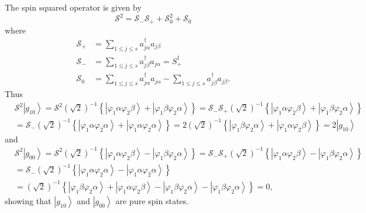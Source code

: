 \documentclass[aps,preprint]{revtex4}%
\begin{document}
The spin squared operator is given by
\[
\mathcal{S}^{2}=\mathcal{S}_{-}\mathcal{S}_{+}+\mathcal{S}_{0}^{2}%
+\mathcal{S}_{0}%
\]
where
\begin{align*}
\mathcal{S}_{+}  &  =\sum_{1\leq j\leq s}a_{j\alpha}^{\dagger}a_{j\beta}\\
\mathcal{S}_{-}  &  =\sum_{1\leq j\leq s}a_{j\beta}^{\dagger}a_{j\alpha}%
=S_{+}^{\dagger}\\
\mathcal{S}_{0}  &  =\sum_{1\leq j\leq s}a_{j\alpha}^{\dagger}a_{j\alpha}%
-\sum_{1\leq j\leq s}a_{j\beta}^{\dagger}a_{j\beta}.
\end{align*}
Thus
\begin{align*}
&  \mathcal{S}^{2}\left\vert g_{10}\right\rangle =\mathcal{S}^{2}\left(
\sqrt{2}\right)  ^{-1}\left\{  \left\vert \varphi_{1}\alpha\varphi_{2}%
\beta\right\rangle +\left\vert \varphi_{1}\beta\varphi_{2}\alpha\right\rangle
\right\}  =\mathcal{S}_{-}\mathcal{S}_{+}\left(  \sqrt{2}\right)
^{-1}\left\{  \left\vert \varphi_{1}\alpha\varphi_{2}\beta\right\rangle
+\left\vert \varphi_{1}\beta\varphi_{2}\alpha\right\rangle \right\} \\
&  =\mathcal{S}_{-}\left(  \sqrt{2}\right)  ^{-1}\left\{  \left\vert
\varphi_{1}\alpha\varphi_{2}\alpha\right\rangle +\left\vert \varphi_{1}%
\alpha\varphi_{2}\alpha\right\rangle \right\}  =2\left(  \sqrt{2}\right)
^{-1}\left\{  \left\vert \varphi_{1}\beta\varphi_{2}\alpha\right\rangle
+\left\vert \varphi_{1}\alpha\varphi_{2}\beta\right\rangle \right\}
=2\left\vert g_{10}\right\rangle
\end{align*}
and
\begin{align*}
&  \mathcal{S}^{2}\left\vert g_{00}\right\rangle =\mathcal{S}^{2}\left(
\sqrt{2}\right)  ^{-1}\left\{  \left\vert \varphi_{1}\alpha\varphi_{2}%
\beta\right\rangle -\left\vert \varphi_{1}\beta\varphi_{2}\alpha\right\rangle
\right\}  =\mathcal{S}_{-}\mathcal{S}_{+}\left(  \sqrt{2}\right)
^{-1}\left\{  \left\vert \varphi_{1}\alpha\varphi_{2}\beta\right\rangle
-\left\vert \varphi_{1}\beta\varphi_{2}\alpha\right\rangle \right\} \\
&  =\mathcal{S}_{-}\left(  \sqrt{2}\right)  ^{-1}\left\{  \left\vert
\varphi_{1}\alpha\varphi_{2}\alpha\right\rangle -\left\vert \varphi_{1}%
\alpha\varphi_{2}\alpha\right\rangle \right\} \\
&  =\left(  \sqrt{2}\right)  ^{-1}\left\{  \left\vert \varphi_{1}\beta
\varphi_{2}\alpha\right\rangle +\left\vert \varphi_{1}\alpha\varphi_{2}%
\beta\right\rangle -\left\vert \varphi_{1}\beta\varphi_{2}\alpha\right\rangle
-\left\vert \varphi_{1}\beta\varphi_{2}\alpha\right\rangle \right\}  =0,
\end{align*}
showing that $\left\vert g_{10}\right\rangle $ and $\left\vert g_{00}%
\right\rangle $ are pure spin states.
\end{document}
